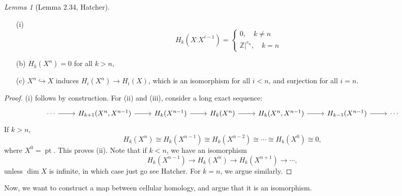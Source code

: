 \documentclass[a4paper]{report}
\theoremstyle{definition}
\theoremstyle{remark}
\theoremstyle{proposition}
\theoremstyle{conjecture}
\theoremstyle{lemma}
\newtheorem{lemma}{Lemma}
\theoremstyle{corollary}
\theoremstyle{exercise}
\newcommand{\on}{\operatorname}
\begin{document}
\begin{lemma}[Lemma 2.34, Hatcher]\label{lem2.34}
    \leavevmode 
    \begin{itemize}
        \item[(i)]  $$H_k(X^, X^{i-1}) = \begin{cases}
            0,\quad k \neq n\\ 
            \mathbb{Z}|^{c_n}, \quad k =n
        \end{cases}$$
        \item[(b)] $H_k(X^n) = 0$ for all $k > n$,
        \item[(c)] $X^n \hookrightarrow X$ induces $H_i(X^n) \to H_i(X)$, 
        which is an isomorphism for all $i < n$, and surjection for all $i = n$.
    \end{itemize}
\end{lemma}
\begin{proof}
    (i) follows by construction. For (ii) and (iii), consider a long exact sequence:
    $$\begin{tikzcd}
        \cdots \arrow[r] & {H_{k+1}(X^n,X^{n-1})} \arrow[r] & H_k(X^{n-1}) \arrow[r] & H_k(X^n) \arrow[r] & {H_k(X^n,X^{n-1})} \arrow[r] & H_{k-1}(X^{n-1}) \arrow[r] & \cdots
    \end{tikzcd}$$
    If $k > n$, 
    $$H_k(X^n) \cong H_k(X^{n-1}) \cong H_k(X^{n-2}) \cong \cdots \cong H_k(X^0) \cong 0,$$
    where $X^0 = \on{pt}$. This proves (ii).
    Note that if $k < n$, we have an isomorphism $$H_k(X^{n-1}) \to H_k(X^n) \to H_k(X^{n+1}) \to \cdots,$$
    unless $\dim X$ is infinite, in which case just go see Hatcher. For $k = n$, we argue similarly.
\end{proof}

Now, we want to construct a map between cellular homology, and argue that it is an isomorphism.
\end{document}
